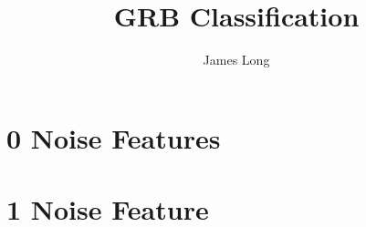 \documentclass[10pt]{article}
\title{GRB Classification}
\date{}
\author{James Long}
\begin{document}
\section{0 Noise Features}





\section{1 Noise Feature}








%
%
%

%
%
%
%
\end{document}
